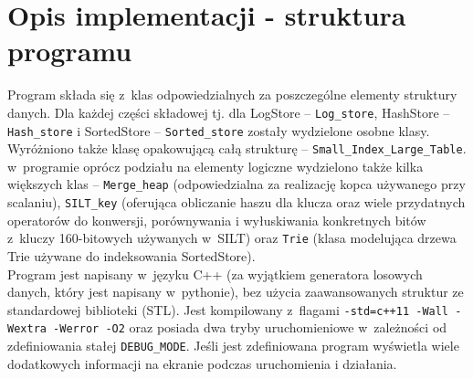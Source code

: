 \documentclass[declaration,shortabstract,masc]{iithesis}
\begin{document}
		\section{Opis implementacji - struktura programu}
			Program składa się z~klas odpowiedzialnych za poszczególne elementy struktury danych. Dla każdej części składowej tj. dla LogStore -- \texttt{Log\_store}, HashStore -- \texttt{Hash\_store} i SortedStore -- \texttt{Sorted\_store} zostały wydzielone osobne klasy. Wyróżniono także klasę opakowującą całą strukturę -- \texttt{Small\_Index\_Large\_Table}.\\
			\indent w~programie oprócz podziału na elementy logiczne wydzielono także kilka większych klas -- \texttt{Merge\_heap} (odpowiedzialna za realizację kopca używanego przy scalaniu), \texttt{SILT\_key} (oferująca obliczanie haszu dla klucza oraz wiele przydatnych operatorów do konwersji, porównywania i wyłuskiwania konkretnych bitów z~kluczy 160-bitowych używanych w~SILT) oraz \texttt{Trie} (klasa modelująca drzewa Trie używane do indeksowania SortedStore).\\
			\indent Program jest napisany w~języku C++ (za wyjątkiem generatora losowych danych, który jest napisany w~pythonie), bez użycia zaawansowanych struktur ze standardowej biblioteki (STL). Jest kompilowany z~flagami \texttt{-std=c++11 -Wall -Wextra -Werror -O2} oraz posiada dwa tryby uruchomieniowe w~zależności od zdefiniowania stałej \texttt{DEBUG\_MODE}. Jeśli jest zdefiniowana program wyświetla wiele dodatkowych informacji na ekranie podczas uruchomienia i działania.
\end{document}
